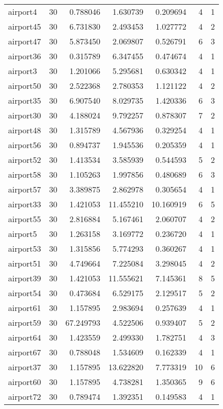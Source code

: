 \begin{longtable}{|l|r|r|r|r|r|r|}
airport4 & 30 & 0.788046 & 1.630739 & 0.209694 & 4 & 1 \\
airport45 & 30 & 6.731830 & 2.493453 & 1.027772 & 4 & 2 \\
airport47 & 30 & 5.873450 & 2.069807 & 0.526791 & 6 & 3 \\
airport36 & 30 & 0.315789 & 6.347455 & 0.474674 & 4 & 1 \\
airport3 & 30 & 1.201066 & 5.295681 & 0.630342 & 4 & 1 \\
airport50 & 30 & 2.522368 & 2.780353 & 1.121122 & 4 & 2 \\
airport35 & 30 & 6.907540 & 8.029735 & 1.420336 & 6 & 3 \\
airport30 & 30 & 4.188024 & 9.792257 & 0.878307 & 7 & 2 \\
airport48 & 30 & 1.315789 & 4.567936 & 0.329254 & 4 & 1 \\
airport56 & 30 & 0.894737 & 1.945536 & 0.205359 & 4 & 1 \\
airport52 & 30 & 1.413534 & 3.585939 & 0.544593 & 5 & 2 \\
airport58 & 30 & 1.105263 & 1.997856 & 0.480689 & 6 & 3 \\
airport57 & 30 & 3.389875 & 2.862978 & 0.305654 & 4 & 1 \\
airport33 & 30 & 1.421053 & 11.455210 & 10.160919 & 6 & 5 \\
airport55 & 30 & 2.816884 & 5.167461 & 2.060707 & 4 & 2 \\
airport5 & 30 & 1.263158 & 3.169772 & 0.236720 & 4 & 1 \\
airport53 & 30 & 1.315856 & 5.774293 & 0.360267 & 4 & 1 \\
airport51 & 30 & 4.749664 & 7.225084 & 3.298045 & 4 & 2 \\
airport39 & 30 & 1.421053 & 11.555621 & 7.145361 & 8 & 5 \\
airport54 & 30 & 0.473684 & 6.529175 & 2.129517 & 5 & 2 \\
airport61 & 30 & 1.157895 & 2.983694 & 0.257639 & 4 & 1 \\
airport59 & 30 & 67.249793 & 4.522506 & 0.939407 & 5 & 2 \\
airport64 & 30 & 1.423559 & 2.499330 & 1.782751 & 4 & 3 \\
airport67 & 30 & 0.788048 & 1.534609 & 0.162339 & 4 & 1 \\
airport37 & 30 & 1.157895 & 13.622820 & 7.773319 & 10 & 6 \\
airport60 & 30 & 1.157895 & 4.738281 & 1.350365 & 9 & 6 \\
airport72 & 30 & 0.789474 & 1.392351 & 0.149583 & 4 & 1 \\

\end{longtable}
